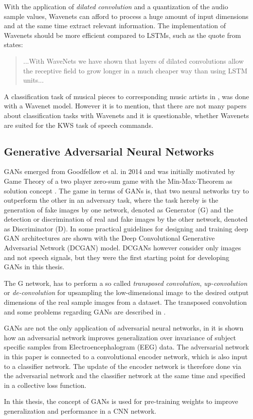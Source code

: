 With the application of \emph{dilated convolution} and a quantization of the audio sample values, Wavenets can afford to process a huge amount of input dimensions and at the same time extract relevant information.
The implementation of Wavenets should be more efficient compared to LSTMs, such as the quote from \cite{Oord2016} states:
\begin{quote}
  ...With WaveNets we have shown that layers of dilated convolutions allow the receptive field to grow longer in a much cheaper way than using LSTM units...
\end{quote}
A classification task of musical pieces to corresponding music artists in \cite{Zhang2020}, was done with a Wavenet model.
However it is to mention, that there are not many papers about classification tasks with Wavenets and it is questionable, whether Wavenets are suited for the KWS task of speech commands.



\subsection{Generative Adversarial Neural Networks}\label{sec:prev_nn_adv}
GANs emerged from Goodfellow et al. in 2014 \cite{Goodfellow2014} and was initially motivated by Game Theory of a two player zero-sum game with the Min-Max-Theorem as solution concept \cite{VonNeumann1944}.
The game in terms of GANs is, that two neural networks try to outperform the other in an adversary task, where the task hereby is the generation of fake images by one network, denoted as Generator (G) and the detection or discrimination of real and fake images by the other network, denoted as Discriminator (D).
In \cite{Radford2016} some practical guidelines for designing and training deep GAN architectures are shown with the Deep Convolutional Generative Adversarial Network (DCGAN) model.
DCGANs however consider only images and not speech signals, but they were the first starting point for developing GANs in this thesis.

The G network, has to perform a so called \emph{transposed convolution}, \emph{up-convolution} or \emph{de-convolution} for upsampling the low-dimensional image to the desired output dimensions of the real sample images from a dataset.
The transposed convolution and some problems regarding GANs are described in \cite{Durall2020}.

GANs are not the only application of adversarial neural networks, in \cite{Oezdenizci2020} it is shown how an adversarial network improves generalization over invariance of subject specific samples from Electroencephalogram (EEG) data.
The adversarial network in this paper is connected to a convolutional encoder network, which is also input to a classifier network.
The update of the encoder network is therefore done via the adversarial network and the classifier network at the same time and specified in a collective loss function.

In this thesis, the concept of GANs is used for pre-training weights to improve generalization and performance in a CNN network.